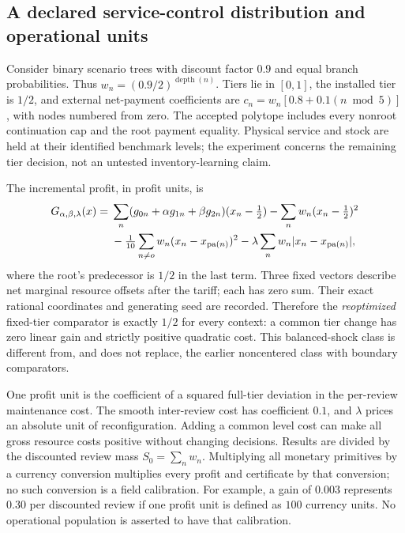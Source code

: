 \documentclass[11pt,letterpaper]{article}
\theoremstyle{definition}
\newcommand{\1}{\mathbf 1}
\begin{document}
\subsection{A declared service-control distribution and operational units}
Consider binary scenario trees with discount factor $0.9$ and equal branch probabilities. Thus $w_n=(0.9/2)^{\operatorname{depth}(n)}$. Tiers lie in $[0,1]$, the installed tier is $1/2$, and external net-payment coefficients are $c_n=w_n[0.8+0.1(n\bmod5)]$, with nodes numbered from zero. The accepted polytope includes every nonroot continuation cap and the root payment equality. Physical service and stock are held at their identified benchmark levels; the experiment concerns the remaining tier decision, not an untested inventory-learning claim.

The incremental profit, in profit units, is
\begin{align}\label{eq:r13-data-objective}
 G_{\alpha,\beta,\lambda}(x)={}&\sum_n(g_{0n}+\alpha g_{1n}+\beta g_{2n})(x_n-\tfrac12)
             -\sum_n w_n(x_n-\tfrac12)^2\notag\\
 &-\tfrac1{10}\sum_{n\ne o}w_n(x_n-x_{\operatorname{pa}(n)})^2
             -\lambda\sum_n w_n|x_n-x_{\operatorname{pa}(n)}|,
\end{align}
where the root's predecessor is $1/2$ in the last term. Three fixed vectors describe net marginal resource offsets after the tariff; each has zero sum. Their exact rational coordinates and generating seed are recorded. Therefore the \emph{reoptimized} fixed-tier comparator is exactly $1/2$ for every context: a common tier change has zero linear gain and strictly positive quadratic cost. This balanced-shock class is different from, and does not replace, the earlier noncentered class with boundary comparators.

One profit unit is the coefficient of a squared full-tier deviation in the per-review maintenance cost. The smooth inter-review cost has coefficient $0.1$, and $\lambda$ prices an absolute unit of reconfiguration. Adding a common level cost can make all gross resource costs positive without changing decisions. Results are divided by the discounted review mass $S_0=\sum_n w_n$. Multiplying all monetary primitives by a currency conversion multiplies every profit and certificate by that conversion; no such conversion is a field calibration. For example, a gain of $0.003$ represents $0.30$ per discounted review if one profit unit is defined as $100$ currency units. No operational population is asserted to have that calibration.
\end{document}
